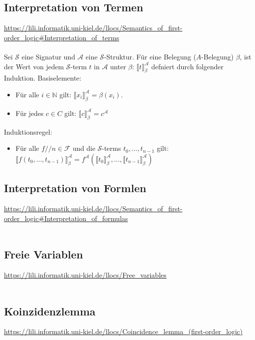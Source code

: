 \documentclass[twocolumn]{article}
\begin{document}
    \subsection{Interpretation von Termen}
    \url{https://lili.informatik.uni-kiel.de/llocs/Semantics_of_first-order_logic#Interpretation_of_terms}\\\\
    Sei $\mathcal S$ eine Signatur und $\mathcal A$ eine $\mathcal S$-Struktur. Für eine Belegung ($A$-Belegung) $\beta$, ist der Wert von jedem  $\mathcal S$-term $t$ in $\mathcal A$ unter $\beta$: $\llbracket t\rrbracket_\beta^\mathcal A$ defniert durch folgender Induktion.
    Basiselemente:
    \begin{itemize}
        \item Für alle $i \in \mathbb{N}$ gilt: $\llbracket x_i\rrbracket_\beta^\mathcal A = \beta(x_i)$.
        \item Für jedes $c \in C$ gilt: $\llbracket c\rrbracket_\beta^\mathcal A = c^{\mathcal A}$
    \end{itemize}
    Induktionsregel:
    \begin{itemize}
        \item Für alle $f/\!/n \in \mathcal F$ und die $\mathcal S$-terms $t_0, \dots, t_{n-1}$ gilt: $\llbracket f(t_0, \dots, t_{n-1})\rrbracket_\beta^\mathcal A = f^\mathcal A(\llbracket t_0\rrbracket_\beta^\mathcal A, \dots, \llbracket t_{n-1}\rrbracket_\beta^\mathcal A)$
    \end{itemize}

    \subsection{Interpretation von Formlen}
    \url{https://lili.informatik.uni-kiel.de/llocs/Semantics_of_first-order_logic#Interpretation_of_formulas}\\\\


    \subsection{Freie Variablen}
    \url{https://lili.informatik.uni-kiel.de/llocs/Free_variables}\\\\

    \subsection{Koinzidenzlemma}
    \url{https://lili.informatik.uni-kiel.de/llocs/Coincidence_lemma_(first-order_logic)}\\\\
\end{document}
